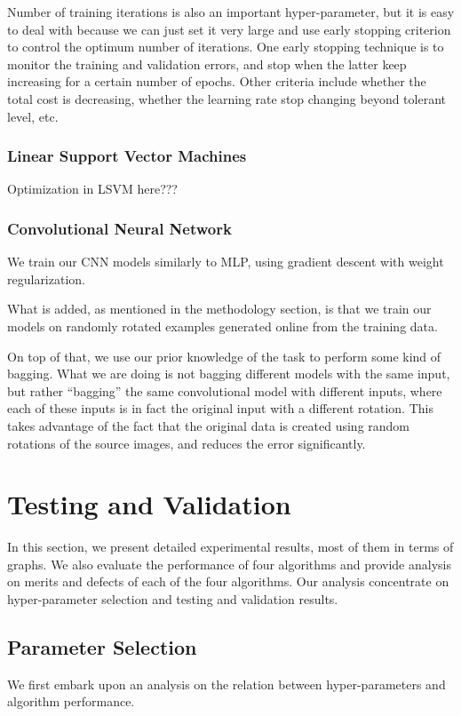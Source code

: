 \documentclass{acm_proc_article-sp}
\begin{document}
Number of training iterations is also an important hyper-parameter, but it is easy to deal with because we can just set it very large and use early stopping criterion to control the optimum number of iterations. One early stopping technique is to monitor the training and validation errors, and stop when the latter keep increasing for a certain number of epochs. Other criteria include whether the total cost is decreasing, whether the learning rate stop changing beyond tolerant level, etc.    

\subsubsection{Linear Support Vector Machines}
Optimization in LSVM here???

\subsubsection{Convolutional Neural Network}
We train our CNN models similarly to MLP, using gradient descent with weight regularization.

What is added, as mentioned in the methodology section, is that we train our models on randomly rotated examples generated online from the training data.

On top of that, we use our prior knowledge of the task to perform some kind of bagging. What we are doing is not bagging different models with the same input, but rather ``bagging'' the same convolutional model with different inputs, where each of these inputs is in fact the original input with a different rotation. This takes advantage of the fact that the original data is created using random rotations of the source images, and reduces the error significantly.






\section{Testing and Validation}
In this section, we present detailed experimental results, most of them in terms of graphs. We also evaluate the performance of four algorithms and provide analysis on merits and defects of each of the four algorithms. Our analysis concentrate on hyper-parameter selection and testing and validation results.

\subsection{Parameter Selection}
We first embark upon an analysis on the relation between hyper-parameters and algorithm performance.
 
\end{document}
